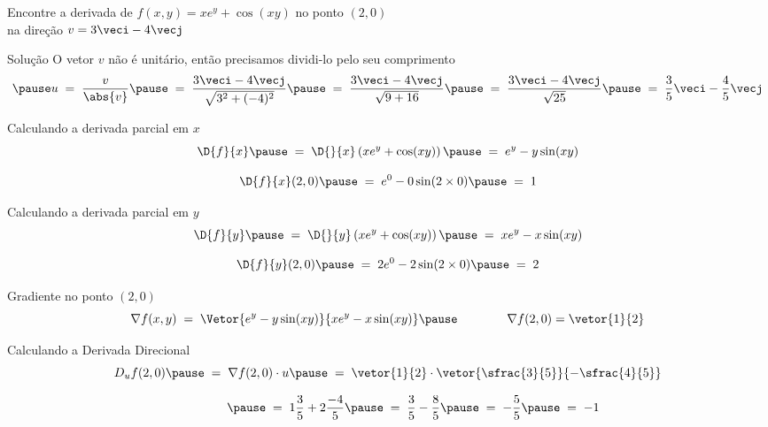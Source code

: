 \begin{question}
  Encontre a derivada de
  \(
    f(x, y) = xe^y + \cos(xy)
  \)
  no ponto
  \(
    (2, 0)
  \) \\

  \smallskip
  na direção
  \(
    v=3\veci-4\vecj
  \)
\end{question}

\begin{resolution}{Solução}
  O vetor $v$ não é unitário,
  \pause
  então precisamos dividi-lo pelo seu
  comprimento
  \[
    \pause
    u
    \;=\; \frac{v}{\abs{v}}
    \pause
    \;=\; \frac{3\veci-4\vecj}{\sqrt{3^2+(-4)^2}}
    \pause
    \;=\; \frac{3\veci-4\vecj}{\sqrt{9+16}}
    \pause
    \;=\; \frac{3\veci-4\vecj}{\sqrt{25}}
    \pause
    \;=\; \frac{3}{5}\veci - \frac{4}{5}\vecj
  \]
\end{resolution}

\begin{resolution}{Calculando a derivada parcial em $x$}
  \[
    \D{f}{x}
    \pause
    \;=\;  \D{}{x}\left(xe^y + \cos(xy)\right)
    \pause
    \;=\;  e^y - y\sin(xy)
  \]

  \pause
  \bigskip
  \[
    \D{f}{x}(2, 0)
    \pause
    \;=\;  e^0 - 0\sin(2\times 0)
    \pause
    \;=\;  1
  \]
\end{resolution}

\begin{resolution}{Calculando a derivada parcial em $y$}
  \[
    \D{f}{y}
    \pause
    \;=\; \D{}{y}\left(xe^y + \cos(xy)\right)
    \pause
    \;=\; xe^y - x\sin(xy)
  \]

  \pause
  \bigskip
  \[
    \D{f}{y}(2, 0)
    \pause
    \;=\; 2e^0 - 2\sin(2\times 0)
    \pause
    \;=\; 2
  \]
\end{resolution}

\begin{resolution}{Gradiente no ponto $(2, 0)$}
  \[
    \nabla f(x, y)
    \;=\; \Vetor{e^y - y\sin(xy)}{xe^y - x\sin(xy)}
    \pause
    \qquad\qquad
    \nabla f(2, 0)
    = \vetor{1}{2}
  \]
\end{resolution}

\begin{resolution}{Calculando a Derivada Direcional}
  \[
    D_u f(2, 0)
    \pause
    \;=\; \nabla f(2, 0) \cdot u
    \pause
    \;=\; \vetor{1}{2} \cdot \vetor{\sfrac{3}{5}}{-\sfrac{4}{5}}
  \]

  \[
    \hphantom{D_u f(2, 0){}}
    \pause
    \;=\; 1 \frac{3}{5} + 2 \frac{-4}{5}
    \pause
    \;=\; \frac{3}{5} - \frac{8}{5}
    \pause
    \;=\; - \frac{5}{5}
    \pause
    \;=\; -1
  \]
\end{resolution}

